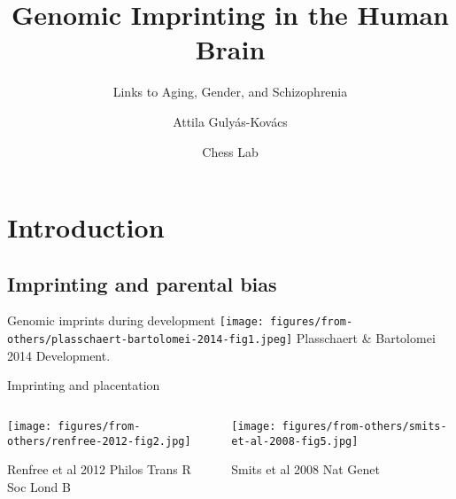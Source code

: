 \documentclass{beamer}
\title{Genomic Imprinting in the Human Brain}
\subtitle{Links to Aging, Gender, and Schizophrenia}
\author{Attila Guly\'{a}s-Kov\'{a}cs}
\date{Chess Lab}
\begin{document}
\maketitle

\begin{frame}

\tableofcontents
\end{frame}

\section{Introduction}
\subsection{Imprinting and parental bias}

\begin{frame}{Genomic imprints during development}
\texttt{[image: figures/from-others/plasschaert-bartolomei-2014-fig1.jpeg]}
\vfill
{\tiny Plasschaert \& Bartolomei 2014 Development.}
\end{frame}

\begin{frame}{Imprinting and placentation}{}
\begin{columns}[t]
\begin{column}{0.4\textwidth}

\texttt{[image: figures/from-others/renfree-2012-fig2.jpg]}

{\tiny Renfree et al 2012 Philos Trans R Soc Lond B}

\end{column}

\begin{column}{0.6\textwidth}

\texttt{[image: figures/from-others/smits-et-al-2008-fig5.jpg]}

{\tiny Smits et al 2008 Nat Genet}
\end{column}
\end{columns}
\begin{center}
\end{center}
\end{frame}
\end{document}
